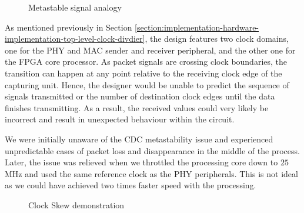 \documentclass[a4paper]{report}
\begin{document}
\begin{figure}[h!]
  \caption{Metastable signal analogy \cite{stephenson-2009}}
  \label{fig:metastability-analogy}
\end{figure}

As mentioned previously in Section \ref{section:implementation-hardware-implementation-top-level-clock-divdier}, the design features two clock domains, one for the PHY and MAC sender and receiver peripheral, and the other one for the FPGA core processor. As packet signals are crossing clock boundaries, the transition can happen at any point relative to the receiving clock edge of the capturing unit. Hence, the designer would be unable to predict the sequence of signals transmitted or the number of destination clock edges until the data finishes transmitting. As a result, the received values could very likely be incorrect and result in unexpected behaviour within the circuit. 
 
We were initially unaware of the CDC metastability issue and experienced unpredictable cases of packet loss and disappearance in the middle of the process. Later, the issue was relieved when we throttled the processing core down to $25$ MHz and used the same reference clock as the PHY peripherals. This is not ideal as we could have achieved two times faster speed with the processing.

\begin{figure}[h!]
  \caption{Clock Skew demonstration \cite{arar-2018}}
  \label{fig:clock-skew}
\end{figure}
\end{document}
